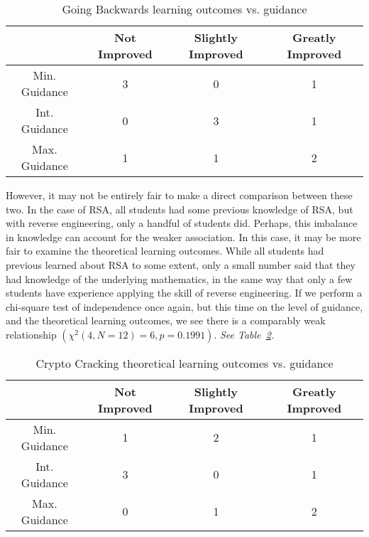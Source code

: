             \begin{table}
            \begin{center}
                \begin{tabular}{|c|c|c|c|}
                    \hline
                        & Not Improved & Slightly Improved & Greatly Improved \\
                    \hline
                    Min. %
Guidance & 3 & 0 & 1\\
                    \hline
                    Int. %
Guidance & 0 & 3 & 1\\
                    \hline
                    Max. %
Guidance & 1 & 1 & 2\\
                    \hline
                \end{tabular}

                \caption{Going Backwards learning outcomes vs. %
guidance}\label{tab:gb-LO-v-g}
            \end{center}
            \end{table}

        However, it may not be entirely fair to make a direct comparison between these two. %
In the case of RSA, all students had some previous knowledge of RSA, but with reverse engineering, only a handful of students did. %
Perhaps, this imbalance in knowledge can account for the weaker association. %
In this case, it may be more fair to examine the theoretical learning outcomes. %
While all students had previous learned about RSA to some extent, only a small number said that they had knowledge of the underlying mathematics, in the same way that only a few students have experience applying the skill of reverse engineering. %
If we perform a chi-square test of independence once again, but this time on the level of guidance, and the theoretical learning outcomes, we see there is a comparably weak relationship $(\chi^2(4, N=12)=6,  p = 0.1991)$. %
\emph{See Table~\ref{tab:cc-tLO-v-g}.}

        \begin{table}
        \begin{center}
            \begin{tabular}{|c|c|c|c|}
                \hline
                    & Not Improved & Slightly Improved & Greatly Improved \\
                \hline
                Min. %
Guidance & 1 & 2 & 1\\
                \hline
                Int. %
Guidance & 3 & 0 & 1\\
                \hline
                Max. %
Guidance & 0 & 1 & 2\\
                \hline
            \end{tabular}

            \caption{Crypto Cracking theoretical learning outcomes vs. %
guidance}\label{tab:cc-tLO-v-g}
        \end{center}
        \end{table}

